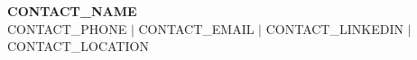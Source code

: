 \documentclass[letterpaper,11pt]{article}
\begin{document}
\begin{center}
    \textbf{\Huge \scshape {{{CONTACT_NAME}}}} \\ \vspace{1pt}
    \small {{{CONTACT_PHONE}}} $|$ {{{CONTACT_EMAIL}}} $|$
    {{{CONTACT_LINKEDIN}}} $|$ {{{CONTACT_LOCATION}}}
\end{center}








\end{document}
